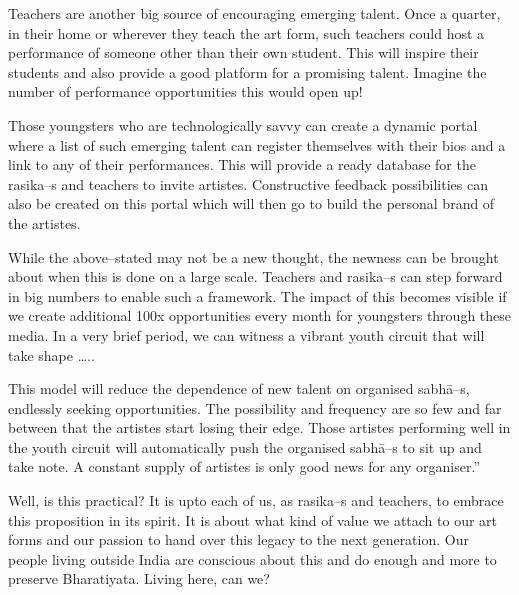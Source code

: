 \begin{itemize}
\begin{myquote}
Teachers are another big source of encouraging emerging talent. Once a quarter, in their home or wherever they teach the art form, such teachers could host a performance of someone other than their own student. This will inspire their students and also provide a good platform for a promising talent. Imagine the number of performance opportunities this would open up!
\end{myquote}

\begin{myquote}
Those youngsters who are technologically savvy can create a dynamic portal where a list of such emerging talent can register themselves with their bios and a link to any of their performances. This will provide a ready database for the rasika–s and teachers to invite artistes. Constructive feedback possibilities can also be created on this portal which will then go to build the personal brand of the artistes.
\end{myquote}

\begin{myquote}
While the above–stated may not be a new thought, the newness can be brought about when this is done on a large scale. Teachers and rasika–s can step forward in big numbers to enable such a framework. The impact of this becomes visible if we create additional 100x opportunities every month for youngsters through these media. In a very brief period, we can witness a vibrant youth circuit that will take shape …..
\end{myquote}

\begin{myquote}
This model will reduce the dependence of new talent on organised sabhā–s, endlessly seeking opportunities. The possibility and frequency are so few and far between that the artistes start losing their edge. Those artistes performing well in the youth circuit will automatically push the organised sabhā–s to sit up and take note. A constant supply of artistes is only good news for any organiser.”
\end{myquote}

 Well, is this practical? It is upto each of us, as rasika–s and teachers, to embrace this proposition in its spirit. It is about what kind of value we attach to our art forms and our passion to hand over this legacy to the next generation. Our people living outside India are conscious about this and do enough and more to preserve Bharatiyata. Living here, can we?


\end{itemize}

